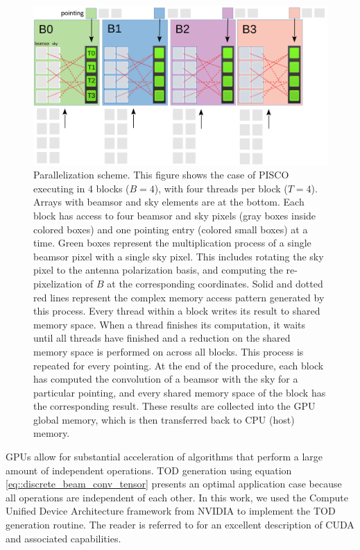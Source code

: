 \documentclass[a4paper,11pt]{article}
\begin{document}
\begin{figure}
	\begin{center}
		\includegraphics[width=0.8\linewidth]{figures/PISCO-diagram.png}
		\caption{Parallelization scheme. This figure shows the case of PISCO executing in 4 blocks ($B=4$), with four threads per block ($T=4$). Arrays with beamsor and sky elements are at the bottom. Each block has access to four beamsor and sky pixels (gray boxes inside colored boxes) and one pointing entry (colored small boxes) at a time. Green boxes represent the multiplication process of a single beamsor pixel with a single sky pixel. This includes rotating the sky pixel to the antenna polarization basis, and computing the re-pixelization of $B$ at the corresponding coordinates. Solid and dotted red lines represent the complex memory access pattern generated by this process. Every thread within a block writes its result to shared memory space. When a thread finishes its computation, it waits until all threads have finished and a reduction on the shared memory space is performed on across all blocks. This process is repeated for every pointing. At the end of the procedure, each block has computed the convolution of a beamsor with the sky for a particular pointing, and every shared memory space of the block has the corresponding result. These results are collected into the GPU global memory, which is then transferred back to CPU (host) memory.}
		\label{fig::pisco_diagram}
	\end{center}
\end{figure}

GPUs allow for substantial acceleration of algorithms that perform a large amount of independent operations. TOD generation using equation \ref{eq::discrete_beam_conv_tensor} presents an optimal application case because all operations are independent of each other. In this work, we used the Compute Unified Device Architecture framework from NVIDIA to implement the TOD generation routine. The reader is referred to \cite{sanders2010cuda} for an excellent description of CUDA and associated capabilities.
\end{document}
